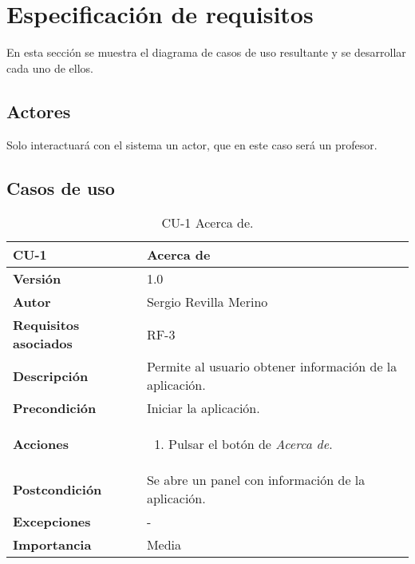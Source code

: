 \section{Especificación de requisitos}
En esta sección se muestra el diagrama de casos de uso resultante y se desarrollar cada uno de ellos.

\begin{landscape}
\end{landscape}

\subsection{Actores}
Solo interactuará con el sistema un actor, que en este caso será un profesor.

\subsection{Casos de uso}

\begin{table}[h]
	\centering
	\begin{tabularx}{\linewidth}{ p{} p{} }
		\toprule
		\textbf{CU-1}    & \textbf{Acerca de}\\
		\toprule
		\textbf{Versión}              & 1.0    \\
		\textbf{Autor}                & Sergio Revilla Merino \\
		\textbf{Requisitos asociados} & RF-3 \\
		\textbf{Descripción}          & Permite al usuario obtener información de la aplicación. \\
		\textbf{Precondición}         & Iniciar la aplicación. \\
		\textbf{Acciones}             &
		\begin{enumerate}
			\def\labelenumi{\arabic{enumi}.}
			\tightlist
			\item Pulsar el botón de \textit{Acerca de}.
		\end{enumerate} \\
		\textbf{Postcondición}        & Se abre un panel con información de la aplicación. \\
		\textbf{Excepciones}          & - \\
		\textbf{Importancia}          & Media \\
		\bottomrule
	\end{tabularx}
	\caption{CU-1 Acerca de.}
\end{table}

